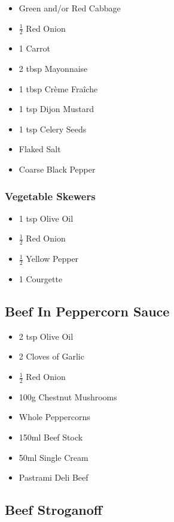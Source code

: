 \documentclass[11pt, english]{article}
\begin{document}
	\begin{itemize}
        \setlength\itemsep{0cm}
                \item Green and/or Red Cabbage
		\item $\frac{1}{2}$ Red Onion
		\item 1 Carrot
		\item 2 tbsp Mayonnaise
		\item 1 tbsp Cr\`{e}me Fra\^{i}che
		\item 1 tsp Dijon Mustard
		\item 1 tsp Celery Seeds
		\item Flaked Salt
		\item Coarse Black Pepper
        \end{itemize}

		\subsubsection*{Vegetable Skewers}

	\begin{itemize}
        \setlength\itemsep{0cm}
		\item 1 tsp Olive Oil
		\item $\frac{1}{2}$ Red Onion
		\item $\frac{1}{2}$ Yellow Pepper
		\item 1 Courgette
        \end{itemize}

\newpage

	\subsection{Beef In Peppercorn Sauce}

	\begin{itemize}
        \setlength\itemsep{0cm}
		\item 2 tsp Olive Oil
		\item 2 Cloves of Garlic
		\item $\frac{1}{2}$ Red Onion
		\item 100g Chestnut Mushrooms
		\item Whole Peppercorns
		\item 150ml Beef Stock
		\item 50ml Single Cream
		\item Pastrami Deli Beef
        \end{itemize}

\newpage

	\subsection{Beef Stroganoff}
\end{document}
